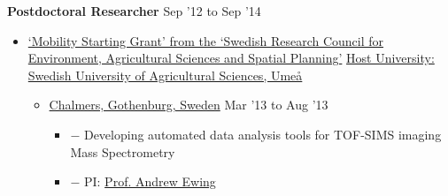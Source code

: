 \documentclass[10pt]{article}
\newenvironment{innerlist}[1][\enskip\textbullet]%
                                                                            {\begin{itemize}[#1,leftmargin=*,parsep=0pt,itemsep=0pt,topsep=0pt,partopsep=0pt]}
                                                                            {\end{itemize}}
\begin{document}
                                                                                           \textbf{Postdoctoral Researcher} \hfill {Sep '12 to Sep '14}
                                                                                           \begin{innerlist}

                                                                                           \item[] \href{http://www.formas.se/}{`Mobility Starting Grant' from the `Swedish Research Council for Environment, Agricultural Sciences and Spatial Planning'}
                                                                                             \href{http://www.slu.se/}{Host University: Swedish University of Agricultural Sciences, Ume\aa} \\
                                                                                             \begin{innerlist}
                                                                                             \item \href{http://www.chalmers.se/}{Chalmers, Gothenburg, Sweden}  \hfill {Mar '13 to Aug '13}
                                                                                               \begin{innerlist}
                                                                                               \item[$-$] Developing automated data analysis tools for TOF-SIMS imaging Mass Spectrometry
                                                                                               \item[$-$] PI:
                                                                                                 \href{http://www.chalmers.se/en/Staff/Pages/andrew-ewing.aspx}%
                                                                                                      {Prof. Andrew Ewing}
                                                                                               \end{innerlist}


\end{innerlist}
\end{innerlist}
\end{document}
